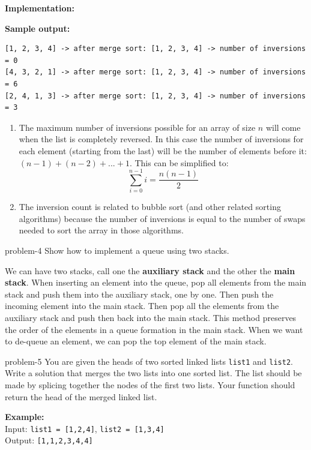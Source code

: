 \documentclass[letterpaper, 11pt]{extarticle}
\begin{document}
\vspace{1ex}
\noindent\textbf{Implementation:}


\vspace{0.5ex}
\noindent\textbf{Sample output:}
\begin{lstlisting}[numbers=none, frame=single, basicstyle=\ttfamily\small]
[1, 2, 3, 4] -> after merge sort: [1, 2, 3, 4] -> number of inversions = 0
[4, 3, 2, 1] -> after merge sort: [1, 2, 3, 4] -> number of inversions = 6
[2, 4, 1, 3] -> after merge sort: [1, 2, 3, 4] -> number of inversions = 3
\end{lstlisting}

\begin{enumerate}
    \item The maximum number of inversions possible for an array of size $n$ will come when the list is completely reversed. In this case the number of inversions for each element (starting from the last) will be the number of elements before it: $ (n-1) + (n-2) + ... + 1$. This can be simplified to: $$ \sum_{i=0}^{n-1} i = \frac{n(n-1)}{2} $$

    \item The inversion count is related to bubble sort (and other related sorting algorithms) because the number of inversions is equal to the number of swaps needed to sort the array in those algorithms.

\end{enumerate}


\begin{problem}{}{problem-4}
    Show how to implement a queue using two stacks.
\end{problem}

We can have two stacks, call one the \textbf{auxiliary stack} and the other the \textbf{main stack}. When inserting an element into the queue, pop all elements from the main stack and push them into the auxiliary stack, one by one. Then push the incoming element into the main stack. Then pop all the elements from the auxiliary stack and push then back into the main stack. This method preserves the order of the elements in a queue formation in the main stack. When we want to de-queue an element, we can pop the top element of the main stack.


\begin{problem}{}{problem-5}
    You are given the heads of two sorted linked lists \texttt{list1} and \texttt{list2}. Write a solution that merges the two lists into one sorted list. The list should be made by splicing together the nodes of the first two lists. Your function should return the head of the merged linked list.

    \vspace{1ex}
    \noindent\textbf{Example:}\\
    Input: \texttt{list1 = [1,2,4]}, \texttt{list2 = [1,3,4]}\\
    Output: \texttt{[1,1,2,3,4,4]}
\end{problem}
\end{document}
